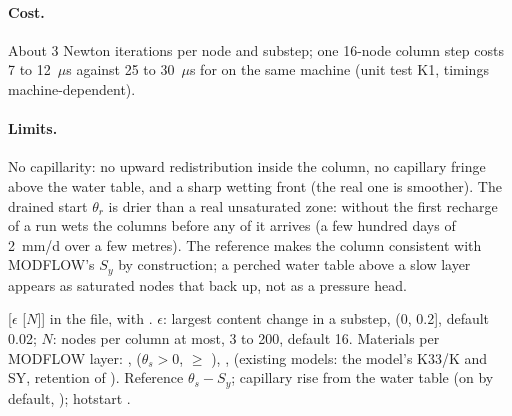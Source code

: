 \paragraph{Cost.} About 3 Newton iterations per node and substep; one 16-node column step costs 7 to 12~$\mu$s against
25 to 30~$\mu$s for  on the same machine (unit test K1, timings machine-dependent).

\paragraph{Limits.} No capillarity: no upward redistribution inside the column, no capillary fringe above the water
table, and a sharp wetting front (the real one is smoother). The drained start $\theta_r$ is drier than a real
unsaturated zone: without  the first recharge of a run wets the columns before any of it
arrives (a few hundred days of 2~mm/d over a few metres). The reference makes the column consistent with MODFLOW's
$S_y$ by construction; a perched water table above a slow layer appears as saturated nodes that back up, not as a
pressure head.

\begin{refcard}{}
 [$\epsilon$ [$N$]] in the  file, with .
$\epsilon$: largest content change in a substep, (0, 0.2], default 0.02; $N$: nodes per column at most, 3 to 200,
default 16. Materials per MODFLOW layer: ,  ($\theta_s>0$, $\ge$ ),
,  (existing models: the model's K33/K and SY, retention of
). Reference $\theta_s-S_y$; capillary rise from the water table (on by default,
); hotstart .
\end{refcard}
